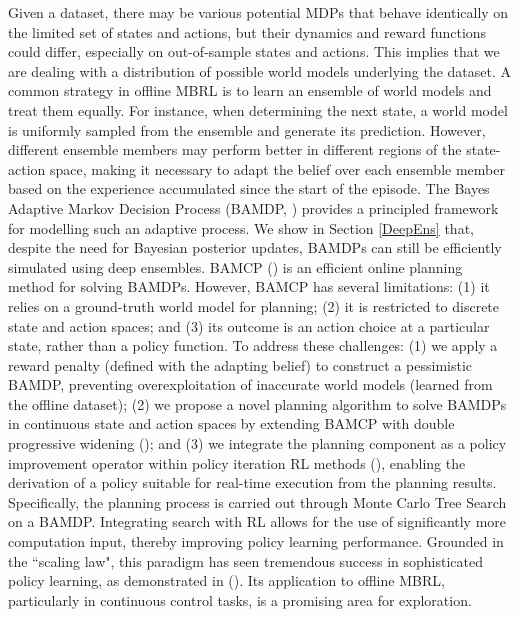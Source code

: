 Given a dataset, there may be various potential MDPs that behave identically on the limited set of states and actions, but their dynamics and reward functions could differ, especially on out-of-sample states and actions. This implies that we are dealing with a distribution of possible world models underlying the dataset. A common strategy in offline MBRL is to learn an ensemble of world models and treat them equally. For instance, when determining the next state, a world model is uniformly sampled from the ensemble and generate its prediction. However, different ensemble members may perform better in different regions of the state-action space, making it necessary to adapt the belief over each ensemble member based on the experience accumulated since the start of the episode. The Bayes Adaptive Markov Decision Process (BAMDP, \cite{duff2002optimal}) provides a principled framework for modelling such an adaptive process. We show in Section \ref{DeepEns} that, despite the need for Bayesian posterior updates, BAMDPs can still be efficiently simulated using deep ensembles. BAMCP (\cite{DBLP:journals/jair/GuezSD13}) is an efficient online planning method for solving BAMDPs. However, BAMCP has several limitations: (1) it relies on a ground-truth world model for planning; (2) it is restricted to discrete state and action spaces; and (3) its outcome is an action choice at a particular state, rather than a policy function. To address these challenges: (1) we apply a reward penalty (defined with the adapting belief) to construct a pessimistic BAMDP, preventing overexploitation of inaccurate world models (learned from the offline dataset); (2) we propose a novel planning algorithm to solve BAMDPs in continuous state and action spaces by extending BAMCP with double progressive widening (\cite{DBLP:conf/pkdd/AugerCT13}); and (3) we integrate the planning component as a policy improvement operator within policy iteration RL methods (\cite{Sutton1998}), enabling the derivation of a policy suitable for real-time execution from the planning results. Specifically, the planning process is carried out through Monte Carlo Tree Search on a BAMDP. Integrating search with RL allows for the use of significantly more computation input, thereby improving policy learning performance. Grounded in the ``scaling law", this paradigm has seen tremendous success in sophisticated policy learning, as demonstrated in (\cite{DBLP:journals/nature/SilverSSAHGHBLB17, DBLP:journals/nature/SchrittwieserAH20, deepmind2024ai}). Its application to offline MBRL, particularly in continuous control tasks, is a promising area for exploration. 

